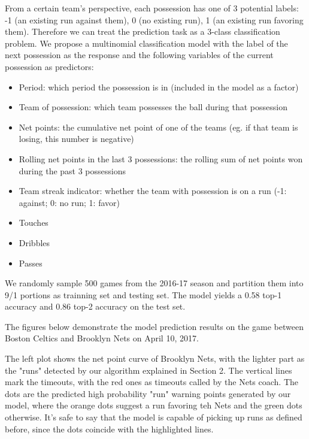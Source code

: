 \documentclass{article}
\begin{document}
From a certain team's perspective, each possession has one of 3 potential labels: -1 (an existing run against them), 0 (no existing run), 1 (an existing run favoring them). Therefore we can treat the prediction task as a 3-class classification problem. We propose a multinomial classification model with the label of the next possession as the response and the following variables of the current possession as predictors:\newline

\begin{itemize}
   \item  Period: which period the possession is in (included in the model as a factor)
   \item  Team of possession: which team possesses the ball during that possession
   \item  Net points: the cumulative net point of one of the teams (eg. if that team is losing, this number is negative)
   \item  Rolling net points in the last 3 possessions: the rolling sum of net points won during the past 3 possessions
   \item  Team streak indicator: whether the team with possession is on a run (-1: against; 0: no run; 1: favor)
   \item  Touches
   \item  Dribbles
   \item  Passes
\end{itemize}

We randomly sample 500 games from the 2016-17 season and partition them into 9/1 portions as trainning set and testing set. The model yields a 0.58 top-1 accuracy and 0.86 top-2 accuracy on the test set.\newline

The figures below demonstrate the model prediction results on the game between Boston Celtics and Brooklyn Nets on April 10, 2017. \newline

The left plot shows the net point curve of Brooklyn Nets, with the lighter part as the "runs" detected by our algorithm explained in Section 2. The vertical lines mark the timeouts, with the red ones as timeouts called by the Nets coach. The dots are the predicted high probability "run" warning points generated by our model, where the orange dots suggest a run favoring teh Nets and the green dots otherwise. It's safe to say that the model is capable of picking up runs as defined before, since the dots coincide with the highlighted lines. \newline
\end{document}
